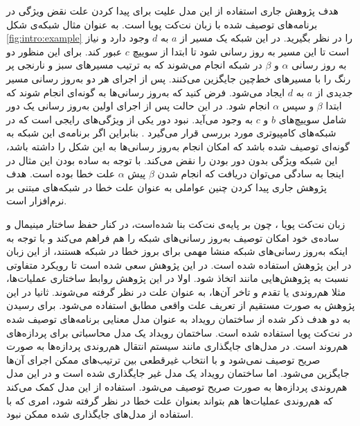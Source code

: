  هدف پژوهش جاری استفاده از این مدل علیت برای پیدا کردن علت نقض 
ویژگی در برنامه‌های توصیف شده با زبان نت‌کت پویا است.
به عنوان مثال شبکه‌ی شکل 
\ref{fig:intro:example}
را در نظر بگیرید.
در این شبکه یک مسیر از 
$a$
به 
$d$
وجود دارد و نیاز است تا این مسیر به روز رسانی شود تا ابتدا از سوییچ 
$c$
عبور کند. 
برای این منظور دو به روز رسانی 
$\alpha$
و
$\beta$
در شبکه انجام می‌شوند که به ترتیب مسیرهای سبز و نارنجی پر رنگ را با مسیر‌های خط‌چین جایگزین می‌کنند.
پس از اجرای هر دو به‌روز رسانی مسیر جدیدی از 
$a$
به 
$d$
ایجاد می‌شود.
فرض کنید که به‌روز رسانی‌ها به گونه‌ای انجام شوند که ابتدا 
$\beta$
و سپس
$\alpha$
انجام شود. 
در این حالت پس از اجرای اولین به‌روز رسانی یک دور
شامل سوییچ‌های 
$b$
و 
$c$
به وجود می‌آید.
نبود دور یکی از ویژگی‌های رایجی است که در شبکه‌های کامپیوتری مورد بررسی قرار می‌گیرد
\cite{network-abstractions}.
بنابراین اگر برنامه‌ی این شبکه به گونه‌ای توصیف شده باشد که امکان انجام به‌روز رسانی‌ها به این شکل را داشته باشد، این شبکه ویژگی بدون دور بودن را نقض می‌کند.
با توجه به ساده بودن این مثال در اینجا به سادگی می‌توان دریافت که انجام شدن 
$\beta$
پیش 
$\alpha$
علت خطا بوده است.
هدف پژوهش جاری پیدا کردن چنین عواملی به عنوان علت خطا در شبکه‌های مبتنی بر نرم‌افزار است.

زبان نت‌کت پویا
، چون بر پایه‌ی نت‌کت بنا شده‌است،
در کنار حفظ ساختار مینیمال و ساده‌ی خود امکان توصیف به‌روز رسانی‌های شبکه‌ را هم فراهم می‌کند
و با توجه به اینکه به‌روز رسانی‌های شبکه منشا مهمی برای بروز خطا در شبکه هستند، از این زبان در این پژوهش استفاده شده است.
در این پژوهش سعی شده است تا رویکرد متفاوتی نسبت به پژوهش‌هایی مانند
\cite{causality-checking,causal-hml,decomposing}
اتخاذ شود.
اولا در این پژوهش روابط ساختاری عملیات‌ها،
مثلا هم‌روندی یا تقدم و تاخر آن‌ها، به عنوان علت در نظر گرفته می‌شوند.
ثانیا در این پژوهش به صورت مستقیم از تعریف علت واقعی مطابق
\cite{hp}
استفاده می‌شود.
برای رسیدن به دو هدف ذکر شده از ساختمان رویداد
 \cite{es}
به عنوان مدل معنایی برنامه‌های توصیف شده در نت‌کت پویا استفاده شده است.
ساختمان رویداد یک مدل محاسباتی
برای پردازه‌های هم‌روند است.
در مدل‌های جایگذاری
مانند سیستم انتقال
هم‌روندی پردازه‌ها به صورت صریح توصیف نمی‌شود و با انتخاب غیرقطعی
بین ترتیب‌های ممکن اجرای آن‌ها جایگزین می‌شود.
اما ساختمان رویداد یک مدل غیر جایگذاری
شده است و در این مدل هم‌روندی پردازه‌ها به صورت صریح توصیف می‌شود.
استفاده از این مدل کمک می‌کند که هم‌روندی عملیات‌ها هم بتواند بعنوان علت خطا در نظر گرفته شود، امری که با استفاده از مدل‌های جایگذاری شده ممکن نبود. 

